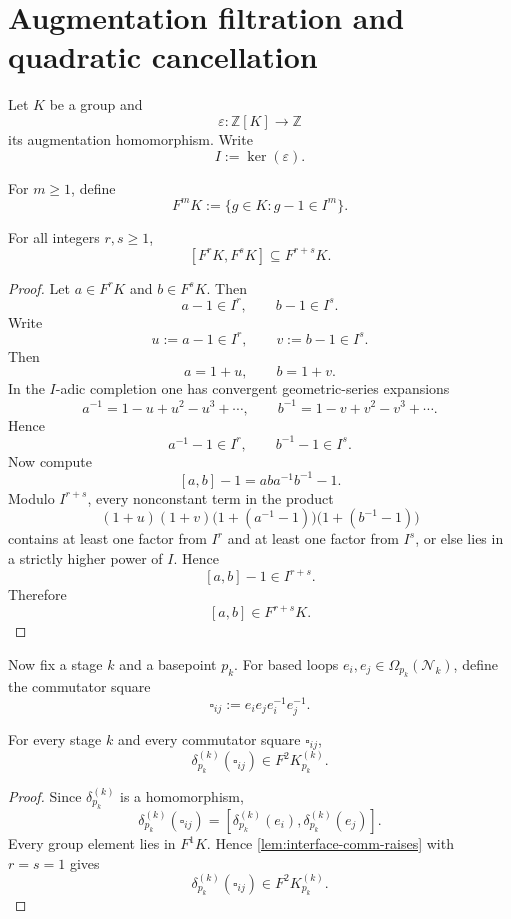 \section{Augmentation filtration and quadratic cancellation}
\label{sec:interface-filtration}
Let \(K\) be a group and
\[
	\varepsilon:\mathbb Z[K]\to \mathbb Z
\]
its augmentation homomorphism. Write
\[
	I:=\ker(\varepsilon).
\]
\begin{definition}
	For \(m\ge 1\), define
	\[
		F^mK
		:=
		\{g\in K: g-1\in I^m\}.
	\]
\end{definition}
\begin{lemma}
	\label{lem:interface-comm-raises}
	For all integers \(r,s\ge 1\),
	\[
		[F^rK,F^sK]\subseteq F^{r+s}K.
	\]
\end{lemma}
\begin{proof}
	Let \(a\in F^rK\) and \(b\in F^sK\). Then
	\[
		a-1\in I^r,
		\qquad
		b-1\in I^s.
	\]
	Write
	\[
		u:=a-1\in I^r,
		\qquad
		v:=b-1\in I^s.
	\]
	Then
	\[
		a=1+u,
		\qquad
		b=1+v.
	\]
	In the \(I\)-adic completion one has convergent geometric-series
	expansions
	\[
		a^{-1}=1-u+u^2-u^3+\cdots,
		\qquad
		b^{-1}=1-v+v^2-v^3+\cdots.
	\]
	Hence
	\[
		a^{-1}-1\in I^r,
		\qquad
		b^{-1}-1\in I^s.
	\]
	Now compute
	\[
		[a,b]-1=aba^{-1}b^{-1}-1.
	\]
	Modulo \(I^{r+s}\), every nonconstant term in the product
	\[
		(1+u)(1+v)\bigl(1+(a^{-1}-1)\bigr)\bigl(1+(b^{-1}-1)\bigr)
	\]
	contains at least one factor from \(I^r\) and at least one factor from
	\(I^s\), or else lies in a strictly higher power of \(I\). Hence
	\[
		[a,b]-1\in I^{r+s}.
	\]
	Therefore
	\[
		[a,b]\in F^{r+s}K.
	\]
\end{proof}
Now fix a stage \(k\) and a basepoint \(p_k\).
For based loops \(e_i,e_j\in \Omega_{p_k}(\mathcal N_k)\), define the
commutator square
\[
	\square_{ij}:=e_ie_je_i^{-1}e_j^{-1}.
\]
\begin{proposition}
	For every stage \(k\) and every commutator square \(\square_{ij}\),
	\[
		\delta_{p_k}^{(k)}(\square_{ij})\in F^2K_{p_k}^{(k)}.
	\]
\end{proposition}
\begin{proof}
	Since \(\delta_{p_k}^{(k)}\) is a homomorphism,
	\[
		\delta_{p_k}^{(k)}(\square_{ij})
		=
		[\delta_{p_k}^{(k)}(e_i),\delta_{p_k}^{(k)}(e_j)].
	\]
	Every group element lies in \(F^1K\). Hence
	\cref{lem:interface-comm-raises} with \(r=s=1\) gives
	\[
		\delta_{p_k}^{(k)}(\square_{ij})\in F^2K_{p_k}^{(k)}.
	\]
\end{proof}
